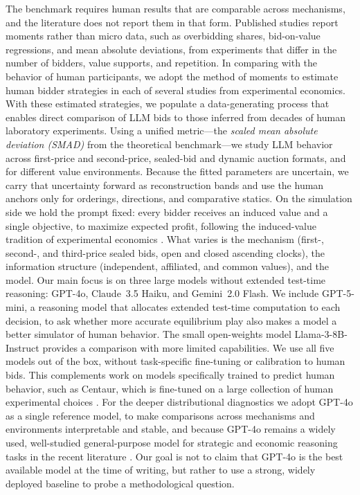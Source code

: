 \documentclass[acmsmall,screen,review]{acmart}
\begin{document}
The benchmark requires human results that are comparable across mechanisms, and the literature does not report them in that form.
Published studies report moments rather than micro data, such as overbidding shares, bid-on-value regressions, and mean absolute deviations, from experiments that differ in the number of bidders, value supports, and repetition.
In comparing with the behavior of human participants, we adopt the method of moments to estimate human bidder strategies in each of several studies from experimental economics.
With these estimated strategies, we populate a data-generating process that enables direct comparison of LLM bids to those inferred from decades of human laboratory experiments.
Using a unified metric---the {\em scaled mean absolute deviation (SMAD)} from the theoretical benchmark---we study LLM behavior across first-price and second-price, sealed-bid and dynamic auction formats, and for different value environments.
Because the fitted parameters are uncertain, we carry that uncertainty forward as reconstruction bands and use the human anchors only for orderings, directions, and comparative statics.
On the simulation side we hold the prompt fixed: every bidder receives an induced value and a single objective, to maximize expected profit, following the induced-value tradition of experimental economics \citep{smith1976experimental}.
What varies is the mechanism (first-, second-, and third-price sealed bids, open and closed ascending clocks), the information structure (independent, affiliated, and common values), and the model.
Our main focus is on three large models without extended test-time reasoning: GPT-4o, Claude~3.5 Haiku, and Gemini~2.0 Flash. We include GPT-5-mini, a reasoning model that allocates extended test-time computation to each decision, to ask whether more accurate equilibrium play also makes a model a better simulator of human behavior. The small open-weights model Llama-3-8B-Instruct provides a comparison with more limited capabilities.
We use all five models out of the box, without task-specific fine-tuning or calibration to human bids. This complements work on models specifically trained to predict human behavior, such as Centaur, which is fine-tuned on a large collection of human experimental choices \citep{binz2025foundation}.
For the deeper distributional diagnostics we adopt GPT-4o as a single reference model, to make comparisons across mechanisms and environments interpretable and stable, and because GPT-4o remains a widely used, well-studied general-purpose model for strategic and economic reasoning tasks in the recent literature \citep{horton2023large, manning2024automated}.
Our goal is not to claim that GPT-4o is the best available model at the time of writing, but rather to use a strong, widely deployed baseline to probe a methodological question.
\end{document}
